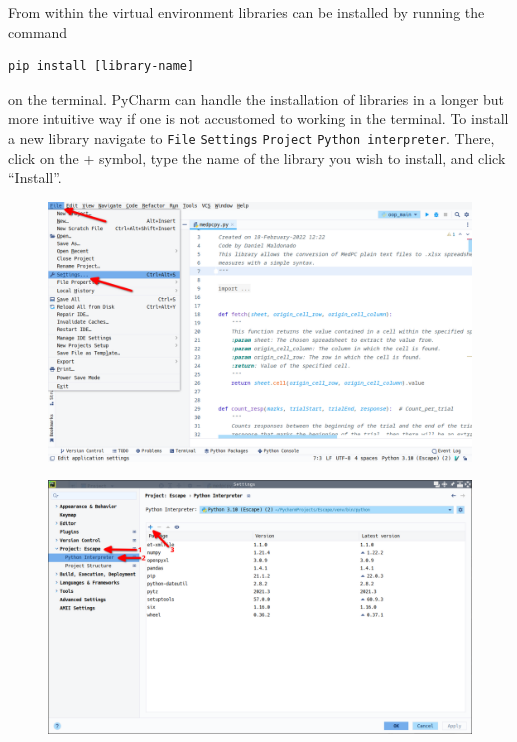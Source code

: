 \documentclass[a4paper,12pt]{article}
\begin{document}
From within the virtual environment libraries can be installed by running the command

\begin{tcolorbox}[
    enhanced,
    attach boxed title to top left={xshift=6mm,yshift=-3mm},
    colback=lightgreen!20,
    colframe=lightgreen,
    sharp corners,
    ]
    \begin{verbatim}
pip install [library-name]
    \end{verbatim}
\end{tcolorbox}
\noindent on the terminal. PyCharm can handle the installation of libraries in a longer but more intuitive way if one is not accustomed to working in the terminal. To install a new library navigate to \verb|File| \textrightarrow \verb|Settings| \textrightarrow \verb|Project| \textrightarrow \verb|Python interpreter|. There, click on the + symbol, type the name of the library you wish to install, and click ``Install''.

\begin{figure}[!ht]
    \begin{center}
        \includegraphics[scale=0.4]{pycharm-settings.png}
    \end{center}
\end{figure}

\begin{figure}[!ht]
    \begin{center}
        \includegraphics[scale=0.4]{pycharm-interpreter-settings.png}
    \end{center}
\end{figure}
\end{document}
